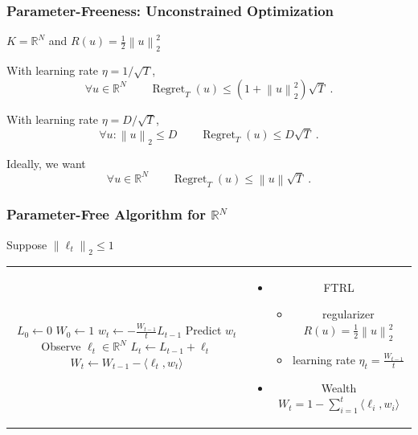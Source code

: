 \documentclass[usenames,dvipsnames]{beamer}
\DeclareMathOperator{\Regret}{Regret}
\newcommand{\R}{\mathbb{R}}
\newcommand{\norm}[1]{\left\|#1\right\|}
\begin{document}
\begin{frame}
\frametitle{Parameter-Freeness: Unconstrained Optimization}

$K=\R^N$ and $R(u) = \frac{1}{2} \norm{u}_2^2$

\pause
\vspace{0.5cm}

With learning rate $\eta = 1/\sqrt{T}$,
$$
\forall u \in \R^N  \qquad \Regret_T(u) \le \left(1 + \norm{u}_2^2 \right) \sqrt{T} \; .
$$

\pause
\vspace{0.5cm}

With learning rate $\eta = D/\sqrt{T}$,
$$
\forall u : \norm{u}_2 \le D \qquad  \Regret_T(u) \le D \sqrt{T} \; .
$$

\pause
\vspace{0.5cm}

Ideally, we want
$$
\forall u \in \R^N \qquad  \Regret_T(u) \le \norm{u} \sqrt{T} \; .
$$
\end{frame}

\begin{frame}
\frametitle{Parameter-Free Algorithm for $\R^N$}

\fontsize{10pt}{14}\selectfont

Suppose $\norm{\ell_t}_2 \le 1$

\vspace{1cm}

\begin{tabular}{c|c}
\begin{minipage}{4.3cm}
\begin{algorithmic}
{
\STATE $L_0 \leftarrow 0$
\STATE $W_0 \leftarrow 1$
\FOR{$t=1,2,3,\dots$}
\STATE $w_t \leftarrow - \frac{W_{t-1}}{t}  L_{t-1} $
\STATE Predict $w_t$
\STATE Observe $\ell_t \in \R^N$
\STATE $L_t \leftarrow L_{t-1} + \ell_t$
\STATE $W_t \leftarrow W_{t-1} - \langle \ell_t, w_t \rangle$
\ENDFOR
}
\end{algorithmic}
\end{minipage}
&
\pause
\begin{minipage}{5.7cm}
\begin{itemize}
\item FTRL
\begin{itemize}
\item regularizer $R(u) = \frac{1}{2}\norm{u}_2^2$
\item learning rate $\eta_t = \frac{W_{t-1}}{t}$
\end{itemize}
\item Wealth $W_t = 1 - \sum_{i=1}^t \langle \ell_i, w_i \rangle$
\end{itemize}
\end{minipage}
\end{tabular}

\end{frame}
\end{document}
